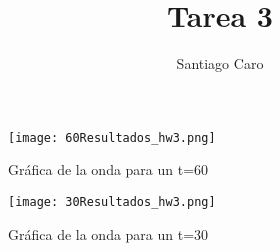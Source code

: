 \documentclass[letterpaper,12pt]{article}
\begin{document}
\title{Tarea 3}
\author{Santiago Caro}
\maketitle

\begin{figure*}
 \centering
   \texttt{[image: 60Resultados\_hw3.png]}
  \caption{Gráfica de la onda para un t=60}
  \label{fig:ejemplo}
\end{figure*}

\begin{figure*}
 \centering
   \texttt{[image: 30Resultados\_hw3.png]}
  \caption{Gráfica de la onda para un t=30}
  \label{fig:ejemplo}
\end{figure*}
\end{document}
